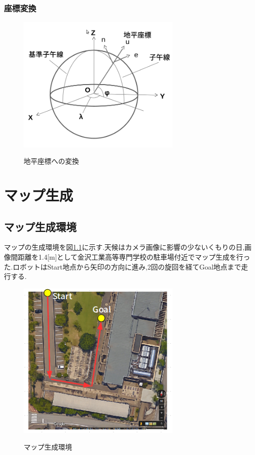 \documentclass[12pt,oneside]{sotsuken_paper}
\begin{document}
\subsection{座標変換}

\begin{figure}[htp]
 \begin{center}
  \includegraphics[width=80mm]{img/soft/zahyou.png}
 　\caption{地平座標への変換}
  \label{fig:zahyou}%
 \end{center}
\end{figure}


\chapter{マップ生成}

\section{マップ生成環境}
マップの生成環境を図\ref{fig:map}に示す.天候はカメラ画像に影響の少ないくもりの日,画像間距離を1.4[m]として金沢工業高等専門学校の駐車場付近でマップ生成を行った.ロボットはStart地点から矢印の方向に進み,2回の旋回を経てGoal地点まで走行する.

\begin{figure}[htp]
 \begin{center}
  \includegraphics[width=80mm]{img/soft/1.png}
 　\caption{マップ生成環境}
  \label{fig:map}%
 \end{center}
\end{figure}
\end{document}
